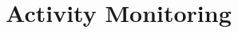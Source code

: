 \documentclass[journal]{IEEEtran}
\let\MYoriglatexcaption\caption
\renewcommand{\caption}[2][\relax]{\MYoriglatexcaption[#2]{#2}}
\begin{document}
%
%


%



\section{Activity Monitoring}
\end{document}
